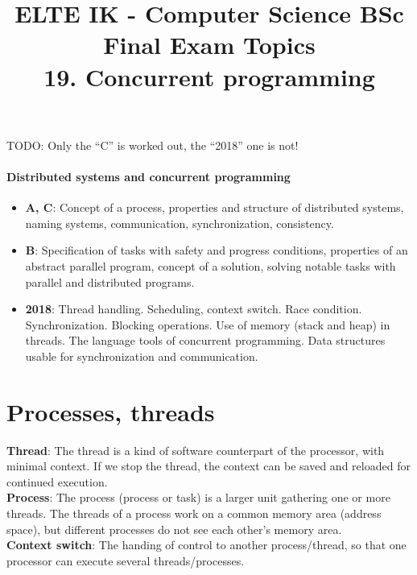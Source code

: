 \documentclass[margin=0px]{article}
\title{\textbf{{\Large ELTE IK - Computer Science BSc} \vspace{0.2cm} \\ {\huge Final Exam Topics}} \vspace{0.3cm} \\ 19. Concurrent programming}
\author{}
\date{}
\newenvironment{tetel}[1]{\paragraph{#1}}{}
\begin{document}
\maketitle

\begin{center}
\end{center}

TODO: Only the ``C'' is worked out, the ``2018'' one is not!

\begin{tetel}{Distributed systems and concurrent programming}
    \begin{itemize}
        \item[] \textbf{A, C}: Concept of a process, properties and structure of distributed systems, naming systems, communication, synchronization, consistency.
        \item[] \textbf{B}: Specification of tasks with safety and progress conditions, properties of an abstract parallel program, concept of a solution, solving notable tasks with parallel and distributed programs.
        \item[] \textbf{2018}: Thread handling. Scheduling, context switch. Race condition. Synchronization. Blocking operations. Use of memory (stack and heap) in threads. The language tools of concurrent programming. Data structures usable for synchronization and communication.
    \end{itemize}
\end{tetel}

\section{Processes, threads}

\noindent \textbf{Thread}: The thread is a kind of software counterpart of the processor, with minimal context. If we stop the thread,
the context can be saved and reloaded for continued execution.\\

\noindent \textbf{Process}: The process (process or task) is a larger unit gathering one or more threads. The threads of a
process work on a common memory area (address space), but different processes do not see each other's memory area.\\

\noindent \textbf{Context switch}: The handing of control to another process/thread, so that one processor can execute several threads/processes.\\
\end{document}
